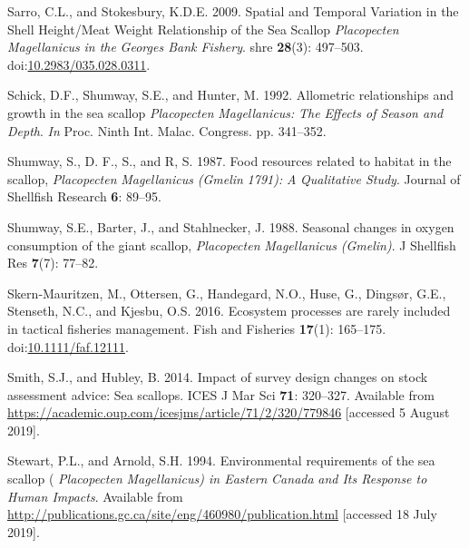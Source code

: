 \documentclass[
]{article}
\newlength{\cslhangindent}
\newlength{\cslentryspacingunit} %
\newenvironment{CSLReferences}[2] %
 {%
  \setlength{\parindent}{0pt}
  \ifodd #1
  \let\oldpar\par
  \def\par{\hangindent=\cslhangindent\oldpar}
  \fi
  \setlength{\parskip}{#2\cslentryspacingunit}
 }%
 {}
\begin{document}
\begin{CSLReferences}{1}{0}
\leavevmode{}%
Sarro, C.L., and Stokesbury, K.D.E. 2009. Spatial and {Temporal Variation} in the {Shell Height}/{Meat Weight Relationship} of the {Sea Scallop} {\emph{Placopecten}}{ \emph{Magellanicus}}{ \emph{\emph{in the}} }{\emph{\emph{Georges Bank Fishery}}}. shre \textbf{28}(3): 497--503. doi:\href{https://doi.org/10.2983/035.028.0311}{10.2983/035.028.0311}.

\leavevmode{}%
Schick, D.F., Shumway, S.E., and Hunter, M. 1992. Allometric relationships and growth in the sea scallop {\emph{Placopecten}}{ \emph{Magellanicus}}{\emph{\emph{:}} }{\emph{\emph{The}}}{ \emph{\emph{Effects of Season and Depth}}}. \emph{In} Proc. {Ninth Int}. {Malac}. {Congress}. pp. 341--352.

\leavevmode{}%
Shumway, S., D. F., S., and R, S. 1987. Food resources related to habitat in the scallop, {\emph{Placopecten}}{ \emph{Magellanicus}}{ \emph{\emph{(}}}{\emph{\emph{Gmelin}}}{ \emph{\emph{1791):}} }{\emph{\emph{A}}}{ \emph{\emph{Qualitative Study}}}. Journal of Shellfish Research \textbf{6}: 89--95.

\leavevmode{}%
Shumway, S.E., Barter, J., and Stahlnecker, J. 1988. Seasonal changes in oxygen consumption of the giant scallop, {\emph{Placopecten}}{ \emph{Magellanicus}}{ \emph{\emph{(}}}{\emph{\emph{Gmelin}}}{\emph{\emph{)}}}. J Shellfish Res \textbf{7}(7): 77--82.

\leavevmode{}%
Skern‐Mauritzen, M., Ottersen, G., Handegard, N.O., Huse, G., Dingsør, G.E., Stenseth, N.C., and Kjesbu, O.S. 2016. Ecosystem processes are rarely included in tactical fisheries management. Fish and Fisheries \textbf{17}(1): 165--175. doi:\href{https://doi.org/10.1111/faf.12111}{10.1111/faf.12111}.

\leavevmode{}%
Smith, S.J., and Hubley, B. 2014. Impact of survey design changes on stock assessment advice: Sea scallops. ICES J Mar Sci \textbf{71}: 320--327. Available from \url{https://academic.oup.com/icesjms/article/71/2/320/779846} {[}accessed 5 August 2019{]}.

\leavevmode{}%
Stewart, P.L., and Arnold, S.H. 1994. Environmental requirements of the sea scallop ( {\emph{Placopecten}}{ \emph{Magellanicus}}{\emph{\emph{) in Eastern}} }{\emph{\emph{Canada}}}{ \emph{\emph{and Its Response to Human Impacts}}}. Available from \url{http://publications.gc.ca/site/eng/460980/publication.html} {[}accessed 18 July 2019{]}.


\end{CSLReferences}
\end{document}
